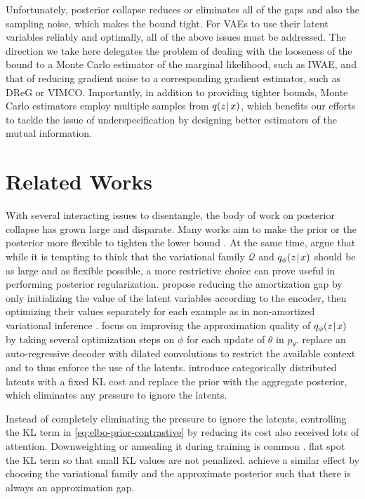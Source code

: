 Unfortunately, posterior collapse reduces or eliminates all of the gaps and also the sampling noise, which makes the bound tight.
For VAEs to use their latent variables reliably and optimally, all of the above issues must be addressed.
The direction we take here delegates the problem of dealing with the looseness of the bound to a Monte Carlo estimator of the marginal likelihood, such as IWAE, and that of reducing gradient noise to a corresponding gradient estimator, such as DReG or VIMCO.
Importantly, in addition to providing tighter bounds, Monte Carlo estimators employ multiple samples from $q(z\hspace{0.08em}|\hspace{0.11em} x)$, which benefits our efforts to tackle the issue of underspecification by designing better estimators of the mutual information.

\section{Related Works}

With several interacting issues to disentangle, the body of work on posterior collapse has grown large and disparate.
Many works aim to make the prior or the posterior more flexible to tighten the lower bound \citep{rezende2015variational,kingma2016improved,tomczak2018vae}.
At the same time, \citet{DBLP:conf/nips/ShuBZKE18} argue that while it is tempting to think that the variational family $\mathcal{Q}$ and $q_{\phi}(z\hspace{0.08em}|\hspace{0.11em} x)$ should be as large and as flexible possible, a more restrictive choice can prove useful in performing posterior regularization.
 propose reducing the amortization gap by only initializing the value of the latent variables according to the encoder, then optimizing their values separately for each example as in non-amortized variational inference \citep{jordan1999introduction}.
 focus on improving the approximation quality of $q_\phi(z\hspace{0.08em}|\hspace{0.11em} x)$ by taking several optimization steps on $\phi$ for each update of $\theta$ in $p_{\theta}$.
 replace an auto-regressive decoder with dilated convolutions to restrict the available context and to thus enforce the use of the latents.
 introduce categorically distributed latents with a fixed KL cost and replace the prior with the aggregate posterior, which eliminates any pressure to ignore the latents.

Instead of completely eliminating the pressure to ignore the latents, controlling the KL term in \eqref{eq:elbo-prior-contrastive} by reducing its cost also received lots of attention.
Downweighting or annealing it during training is common \citep{bowman2015generating,higgins2016beta,sonderby2016ladder,NEURIPS2019_9bdb8b1f,NEURIPS2018_65b0df23}.
 flat spot the KL term so that small KL values are not penalized.
 achieve a similar effect by choosing the variational family and the approximate posterior such that there is always an approximation gap.

